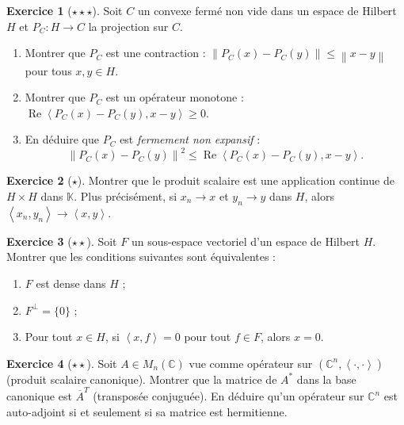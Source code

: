 \documentclass[a4paper,12pt]{book}
\newcommand{\C}{\mathbb{C}}
\newcommand{\K}{\mathbb{K}}
\newcommand{\norm}[1]{\left\| #1 \right\|}
\newcommand{\inner}[2]{\left\langle #1, #2 \right\rangle}
\theoremstyle{definition}
\newtheorem{exercice}{Exercice}[chapter]
\theoremstyle{plain}
\theoremstyle{remark}
\begin{document}
\begin{exercice}[$\star\star\star$]\label{exo:ch2-projection-non-lineaire}
Soit $C$ un convexe fermé non vide dans un espace de Hilbert $H$ et $P_C : H \to C$ la projection sur $C$.
\begin{enumerate}[label=(\alph*)]
    \item Montrer que $P_C$ est une contraction : $\norm{P_C(x) - P_C(y)} \leq \norm{x - y}$ pour tous $x, y \in H$.
    \item Montrer que $P_C$ est un opérateur monotone : $\operatorname{Re}\inner{P_C(x) - P_C(y)}{x - y} \geq 0$.
    \item En déduire que $P_C$ est \emph{fermement non expansif} :
    \[
        \norm{P_C(x) - P_C(y)}^2 \leq \operatorname{Re}\inner{P_C(x) - P_C(y)}{x - y}.
    \]
\end{enumerate}
\end{exercice}

\begin{exercice}[$\star$]\label{exo:ch2-cont-prodscal}
Montrer que le produit scalaire est une application continue de $H \times H$ dans $\K$. Plus précisément, si $x_n \to x$ et $y_n \to y$ dans $H$, alors $\inner{x_n}{y_n} \to \inner{x}{y}$.
\end{exercice}

\begin{exercice}[$\star\star$]\label{exo:ch2-sous-espace-dense}
Soit $F$ un sous-espace vectoriel d'un espace de Hilbert $H$. Montrer que les conditions suivantes sont équivalentes :
\begin{enumerate}[label=(\roman*)]
    \item $F$ est dense dans $H$ ;
    \item $F^\perp = \{0\}$ ;
    \item Pour tout $x \in H$, si $\inner{x}{f} = 0$ pour tout $f \in F$, alors $x = 0$.
\end{enumerate}
\end{exercice}

\begin{exercice}[$\star\star$]\label{exo:ch2-adjoint-matrice}
Soit $A \in M_n(\C)$ vue comme opérateur sur $(\C^n, \inner{\cdot}{\cdot})$ (produit scalaire canonique). Montrer que la matrice de $A^*$ dans la base canonique est $\overline{A}^T$ (transposée conjuguée). En déduire qu'un opérateur sur $\C^n$ est auto-adjoint si et seulement si sa matrice est hermitienne.
\end{exercice}
\end{document}
